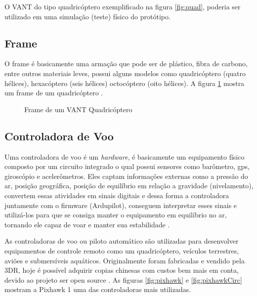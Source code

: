 O VANT do tipo quadricóptero exemplificado na figura \ref{fig:quad}, poderia ser utilizado em uma simulação (teste) físico do protótipo. 
\subsection{Frame}
O frame é basicamente uma armação que pode ser de plástico, fibra de carbono, entre outros materiais leves, possui alguns modelos como quadricóptero (quatro hélices), hexacóptero (seis hélices) octocóptero (oito hélices). A figura \ref{fig:frame} mostra um frame de um quadricóptero \cite{tres}.

\begin{figure}[H]
	\centering
	\caption{Frame de um VANT Quadricóptero}
	\fontsize{9pt}{12pt}\selectfont
	\def\svgwidth{13cm}
	
	\label{fig:frame}
\end{figure}

\subsection{Controladora de Voo}
Uma controladora de voo é um \textit{hardware}, é basicamente um equipamento físico composto por um circuito integrado o qual possui sensores como barômetro, gps, giroscópio e acelerômetros. Eles captam informações externas como a pressão do ar, posição geográfica, posição de equilíbrio em relação a gravidade (nivelamento), convertem essas atividades em sinais digitais e dessa forma a controladora juntamente com o firmware (Ardupilot), conseguem interpretar esses sinais e utilizá-los para que se consiga manter o equipamento em equilíbrio no ar, tornando ele capaz de voar e manter sua estabilidade \cite{sete}.  
   
As controladoras de voo ou piloto automático são utilizadas para desenvolver equipamentos de controle remoto como um quadricóptero, veículos terrestres, aviões e submersíveis aquáticos. Originalmente foram fabricadas e vendido pela 3DR, hoje é possível adquirir copias chinesas com custos bem mais em conta, devido ao projeto ser open source \cite{tres}.
As figuras \ref{fig:pixhawk} e \ref{fig:pixhawkCirc} mostram a Pixhawk 1 uma das controladoras mais utilizadas.

